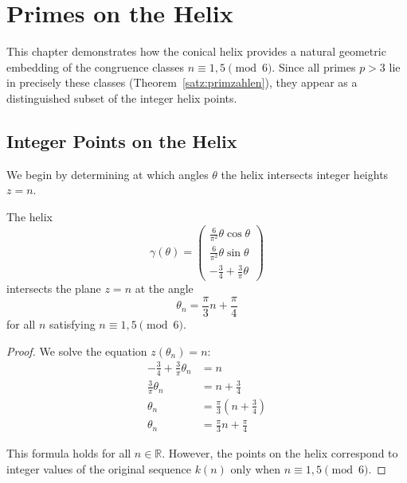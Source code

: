 \chapter{Primes on the Helix}\label{ch:primes}

This chapter demonstrates how the conical helix provides a natural geometric embedding of the congruence classes $n \equiv 1,5\pmod{6}$. Since all primes $p > 3$ lie in precisely these classes (Theorem~\ref{satz:primzahlen}), they appear as a distinguished subset of the integer helix points.

\section{Integer Points on the Helix}

We begin by determining at which angles $\theta$ the helix intersects integer heights $z = n$.

\begin{theorem}\label{thm:integer-points}
The helix
\[
\gamma(\theta) = \begin{pmatrix}
\frac{6}{\pi^2}\theta\cos\theta\\
\frac{6}{\pi^2}\theta\sin\theta\\
-\frac{3}{4} + \frac{3}{\pi}\theta
\end{pmatrix}
\]
intersects the plane $z = n$ at the angle
\begin{equation}\label{eq:theta-n}
\boxed{\theta_n = \frac{\pi}{3}n + \frac{\pi}{4}}
\end{equation}
for all $n$ satisfying $n \equiv 1, 5 \pmod{6}$.
\end{theorem}

\begin{proof}
We solve the equation $z(\theta_n) = n$:
\begin{align}
-\frac{3}{4} + \frac{3}{\pi}\theta_n &= n\\
\frac{3}{\pi}\theta_n &= n + \frac{3}{4}\\
\theta_n &= \frac{\pi}{3}\left(n + \frac{3}{4}\right)\\
\theta_n &= \frac{\pi}{3}n + \frac{\pi}{4}
\end{align}

This formula holds for all $n \in \mathbb{R}$. However, the points on the helix correspond to integer values of the original sequence $k(n)$ only when $n \equiv 1, 5 \pmod{6}$.
\end{proof}


